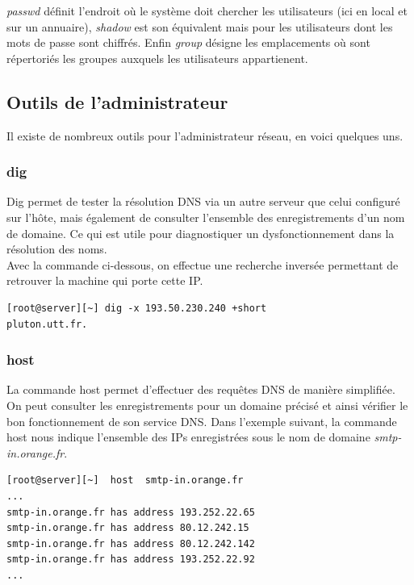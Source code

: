\documentclass[12pt,a4paper,notitlepage]{article}
\begin{document}
\noindent \emph{passwd} définit l'endroit où le système doit chercher les utilisateurs (ici en local et sur un annuaire), \emph{shadow} est son équivalent mais pour les utilisateurs dont les mots de passe sont chiffrés. Enfin \emph{group} désigne les emplacements où sont répertoriés les groupes auxquels les utilisateurs appartienent.


\subsection{Outils de l'administrateur}
Il existe de nombreux outils pour l'administrateur réseau, en voici quelques uns.
\subsubsection{dig}

Dig permet de tester la résolution DNS via un autre serveur que celui configuré sur l'hôte, mais également de consulter l'ensemble des enregistrements d'un nom de domaine. Ce qui est utile pour diagnostiquer un dysfonctionnement dans la résolution des noms.\\

Avec la commande ci-dessous, on effectue une recherche inversée permettant de retrouver la machine qui porte cette IP.

{\footnotesize \begin{verbatim}
[root@server][~] dig -x 193.50.230.240 +short
pluton.utt.fr.
\end{verbatim}}

\subsubsection{host}

La commande host permet d'effectuer des requêtes DNS de manière simplifiée. On peut consulter les enregistrements pour un domaine précisé et ainsi vérifier le bon fonctionnement de son service DNS. Dans l'exemple suivant, la commande host nous indique l'ensemble des IPs enregistrées sous le nom de domaine \emph{smtp-in.orange.fr}.


{\footnotesize \begin{verbatim}
[root@server][~]  host  smtp-in.orange.fr
...
smtp-in.orange.fr has address 193.252.22.65
smtp-in.orange.fr has address 80.12.242.15
smtp-in.orange.fr has address 80.12.242.142
smtp-in.orange.fr has address 193.252.22.92
...
\end{verbatim}}
\end{document}

